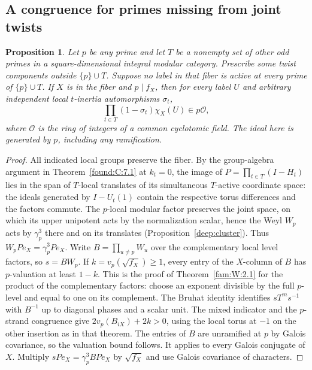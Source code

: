 \documentclass[11pt,a4paper]{article}
\numberwithin{equation}{section}
\newtheorem{proposition}[theorem]{Proposition}
\theoremstyle{remark}
\begin{document}
\subsection{A congruence for primes missing from joint twists}\label{found:J:5}
\begin{proposition}\label{found:J:5.1}\label{found:J:key:pr:missing}
Let $p$ be any prime and let $T$ be a nonempty set of other odd
primes in a square-dimensional integral modular category. Prescribe
some twist components outside $\{p\}\cup T$. Suppose no label in
that fiber is active at every prime of $\{p\}\cup T$. If $X$ is in
the fiber and $p\mid f_X$, then for every label $U$ and arbitrary
independent local $t$-inertia automorphisms $\sigma_t$,
\[
               \prod_{t\in T}(1-\sigma_t)\chi_X(U)\in p\mathcal O ,
\]
where $\mathcal O$ is the ring of integers of a common cyclotomic
field. The ideal here is generated by $p$, including any ramification.
\end{proposition}
\begin{proof}

All indicated local groups preserve the fiber. By the group-algebra
argument in Theorem~\ref{found:C:7.1} at $k_t=0$, the image of
$P=\prod_{t\in T}(I-H_t)$ lies in the span of $T$-local translates
of its simultaneous $T$-active coordinate space: the ideals generated
by $I-U_t(1)$ contain the respective torus differences and the
factors commute.
The $p$-local modular factor preserves the joint space, on which its upper unipotent
acts by the normalization scalar, hence the Weyl $W_p$ acts by
$\gamma_p^3$ there and on its translates (Proposition~\ref{deep:cluster}).
Thus $W_pPe_X=\gamma_p^3Pe_X$.
Write $B=\prod_{u\ne p}W_u$ over the complementary local level
factors, so $s=BW_p$. If $k=v_p(\sqrt{f_X})\ge1$, every entry of
the $X$-column of $B$ has $p$-valuation at least $1-k$. This is
the proof of Theorem~\ref{fam:W:2.1} for the product of the complementary
factors: choose an exponent divisible by the full $p$-level and equal
to one on its complement. The Bruhat identity identifies $sT^m s^{-1}$
with $B^{-1}$ up to diagonal phases and a scalar unit. The mixed
indicator and the $p$-strand congruence give
$2v_p(B_{iX})+2k>0$, using the local torus at $-1$ on the other
insertion as in that theorem. The entries of $B$ are unramified at
$p$ by Galois covariance, so the valuation bound follows. It applies to every Galois conjugate of $X$. Multiply
$sPe_X=\gamma_p^3 BPe_X$ by $\sqrt{f_X}$ and use Galois covariance
of characters.
\end{proof}
\end{document}
